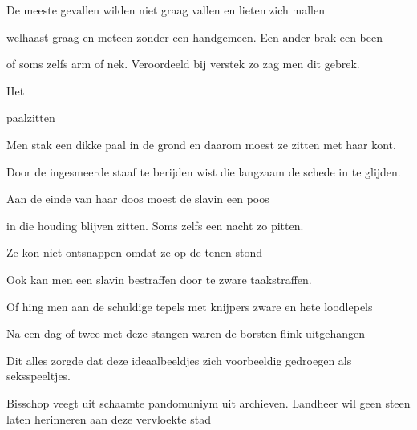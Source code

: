 De meeste gevallen
wilden niet graag vallen
en lieten zich mallen

welhaast graag en meteen
zonder een handgemeen.
Een ander brak een been

of soms zelfs arm of nek.
Veroordeeld bij verstek
zo zag men dit gebrek.

Het

paalzitten

Men stak een dikke paal in de grond
en daarom moest ze zitten met haar kont.

Door de ingesmeerde staaf te berijden
wist die langzaam de schede in te glijden.

Aan de einde van haar doos
moest de slavin een poos

in die houding blijven zitten.
Soms zelfs een nacht zo pitten.

Ze kon niet ontsnappen omdat ze op de tenen stond

Ook kan men een slavin bestraffen
door te zware taakstraffen.

Of hing men aan de schuldige tepels
met knijpers zware en hete loodlepels

Na een dag of twee met deze stangen
waren de borsten flink uitgehangen

Dit alles zorgde dat deze ideaalbeeldjes
zich voorbeeldig gedroegen als seksspeeltjes.

Bisschop veegt uit schaamte pandomuniym uit archieven. Landheer wil geen steen laten herinneren aan deze vervloekte stad
